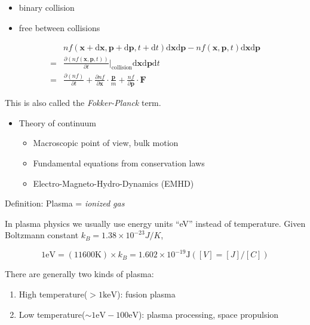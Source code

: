 \documentclass[
  notoc %
]{tufte-book}
\providecommand{\tightlist}{%
  \setlength{\itemsep}{0pt}\setlength{\parskip}{0pt}
}
\begin{document}
\begin{itemize}
\begin{itemize}
\begin{itemize}
      \begin{itemize}
      \tightlist
      \item
        binary collision
      \item
        free between collisions
      \end{itemize}
    \end{itemize}
  \end{itemize}
\end{itemize}

\[
\begin{aligned}
&nf(\mathbf{x}+\mathrm{d}\mathbf{x},\mathbf{p}+\mathrm{d}\mathbf{p},t+\mathrm{d}t)\mathrm{d}\mathbf{x}\mathrm{d}\mathbf{p}-nf(\mathbf{x},\mathbf{p},t)\mathrm{d}\mathbf{x}\mathrm{d}\mathbf{p} \\
=&\frac{\partial (nf(\mathbf{x},\mathbf{p},t))}{\partial t}\Big|_{\text{collision}}\mathrm{d}\mathbf{x}\mathrm{d}\mathbf{p}\mathrm{d}t \nonumber \\
=&\frac{\partial (nf)}{\partial t}+\frac{\partial nf}{\partial \mathbf{x}}\cdot\frac{\mathbf{p}}{m}+\frac{nf}{\partial \mathbf{p}}\cdot\mathbf{F}
\end{aligned}
\]

This is also called the \emph{Fokker-Planck} term.

\begin{itemize}
\tightlist
\item
  Theory of continuum

  \begin{itemize}
  \tightlist
  \item
    Macroscopic point of view, bulk motion
  \item
    Fundamental equations from conservation laws
  \item
    Electro-Magneto-Hydro-Dynamics (EMHD)
  \end{itemize}
\end{itemize}

Definition: Plasma = \emph{ionized gas}

In plasma physics we usually use energy units ``eV'' instead of
temperature. Given Boltzmann constant \(k_B=1.38\times10^{-23}J/K\),

\[
1\text{eV}=(11600\text{K})\times k_B=1.602\times 10^{-19}\text{J} ([V]=[J]/[C])
\]

There are generally two kinds of plasma:

\begin{enumerate}
\def\labelenumi{\arabic{enumi}.}
\tightlist
\item
  High temperature(\(>1\text{keV}\)): fusion plasma
\item
  Low temperature(\(\sim 1\text{eV}-100\text{eV}\)): plasma processing,
  space propulsion
\end{enumerate}
\end{document}
